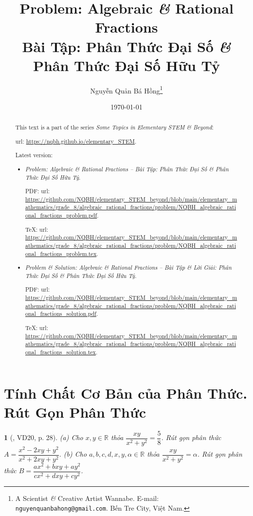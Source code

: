 \documentclass{article}
\title{Problem: Algebraic {\it\&} Rational Fractions\\Bài Tập: Phân Thức Đại Số {\it\&} Phân Thức Đại Số Hữu Tỷ}
\author{Nguyễn Quản Bá Hồng\footnote{A Scientist {\it\&} Creative Artist Wannabe. E-mail: {\tt nguyenquanbahong@gmail.com}. Bến Tre City, Việt Nam.}}
\date{\today}
\newtheorem{baitoan}{}
\begin{document}
\maketitle
\begin{abstract}
	This text is a part of the series {\it Some Topics in Elementary STEM \& Beyond}:
	
	{\sc url}: \url{https://nqbh.github.io/elementary_STEM}.
	
	Latest version:
	\begin{itemize}
		\item {\it Problem: Algebraic \& Rational Fractions -- Bài Tập: Phân Thức Đại Số \& Phân Thức Đại Số Hữu Tỷ}.
		
		PDF: {\sc url}: \url{https://github.com/NQBH/elementary_STEM_beyond/blob/main/elementary_mathematics/grade_8/algebraic_rational_fractions/problem/NQBH_algebraic_rational_fractions_problem.pdf}.
		
		\TeX: {\sc url}: \url{https://github.com/NQBH/elementary_STEM_beyond/blob/main/elementary_mathematics/grade_8/algebraic_rational_fractions/problem/NQBH_algebraic_rational_fractions_problem.tex}.
		\item {\it Problem \& Solution: Algebraic \& Rational Fractions -- Bài Tập \& Lời Giải: Phân Thức Đại Số \& Phân Thức Đại Số Hữu Tỷ}.
		
		PDF: {\sc url}: \url{https://github.com/NQBH/elementary_STEM_beyond/blob/main/elementary_mathematics/grade_8/algebraic_rational_fractions/problem/NQBH_algebraic_rational_fractions_solution.pdf}.
		
		\TeX: {\sc url}: \url{https://github.com/NQBH/elementary_STEM_beyond/blob/main/elementary_mathematics/grade_8/algebraic_rational_fractions/problem/NQBH_algebraic_rational_fractions_solution.tex}.
	\end{itemize}
\end{abstract}
\tableofcontents


\section{Tính Chất Cơ Bản của Phân Thức. Rút Gọn Phân Thức}

\begin{baitoan}[\cite{Tuyen_Toan_8}, VD20, p. 28]
	(a) Cho $x,y\in\mathbb{R}$ thỏa $\dfrac{xy}{x^2 + y^2} = \dfrac{5}{8}$. Rút gọn phân thức $A = \dfrac{x^2 - 2xy + y^2}{x^2 + 2xy + y^2}$. (b) Cho $a,b,c,d,x,y,\alpha\in\mathbb{R}$ thỏa $\dfrac{xy}{x^2 + y^2} = \alpha$. Rút gọn phân thức $B = \dfrac{ax^2 + bxy + ay^2}{cx^2 + dxy + cy^2}$.
\end{baitoan}
\end{document}
